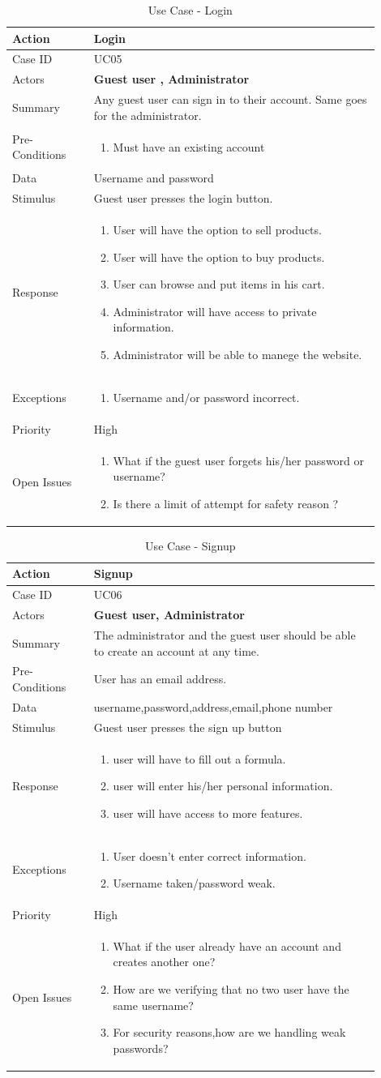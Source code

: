 \documentclass[11pt]{article}
\newcounter{use case ID}
\newcommand\tabularhead[1]{
    \begin{table}[ht]
        \addtocounter{use case ID}{1}
        \caption{Use Case \arabic{use case ID} - #1}
        \vspace{0.2cm}
        \begin{tabular}{|p{0.2\linewidth}|p{0.70\linewidth}|}
            \hline
            \textbf{Action} & \textbf{#1} \\
            \hline}
\newcommand\addrow[2]{#1 & #2\\ \hline}
\newcommand\addmulrow[2]{ \begin{minipage}[t][][t]{2.5cm}#1\end{minipage}
                &\begin{minipage}[t][][t]{11cm}
                    \begin{enumerate}[itemsep=-1ex] #2   \end{enumerate}
                \end{minipage}\vfill\\ \hline}
\newenvironment{usecase}{\tabularhead}
        {\hline\end{tabular}\end{table}}
\begin{document}
\begin{usecase}{Login}
    \addrow{Case ID}{UC05}
    \addrow{Actors}{\textbf{Guest user , Administrator}}
    \addrow{Summary}{Any guest user can sign in to their account. Same goes for the administrator.}
    \addmulrow{Pre-Conditions}{
        \item Must have an existing account
    }
    \addrow{Data}{Username and password}
    \addrow{Stimulus}{Guest user presses the login button.}
    \addmulrow{Response}{
            \item User will have the option to sell products.
            \item User will have the option to buy products.
            \item User can browse and put items in his cart.
            \item Administrator will have access to private information. 
            \item Administrator will be able to manege the website.
    }
    \addmulrow{Exceptions}{
        \item Username and/or password incorrect.
    }
    \addrow{Priority}{High}
    \addmulrow{Open Issues}{
        \item What if the guest user forgets his/her password or username?
        \item Is there a limit of attempt for safety reason ?
    } 
    
\end{usecase}

\begin{usecase}{Signup}
    \addrow{Case ID}{UC06}
    \addrow{Actors}{\textbf{Guest user, Administrator}}
    \addrow{Summary}{The administrator and the guest user should be able to create an account at any time.}
    \addrow{Pre-Conditions}{
       User has an email address.
        }
    \addrow{Data}{
username,password,address,email,phone number
}
    \addrow{Stimulus}{Guest user presses the sign up button}
    \addmulrow{Response}{
        \item user will have to fill out a formula.
        \item user will enter his/her personal information.
        \item user will have access to more features.
    }
    \addmulrow{Exceptions}{
        \item User doesn't enter correct information.
        \item Username taken/password weak.
    }
    \addrow{Priority}{High}
    \addmulrow{Open Issues}{
        \item What if the user already have an account and creates another one?
        \item How are we verifying that no two user have the same username?
        \item For security reasons,how are we handling weak passwords?
    }
\end{usecase}
\end{document}
